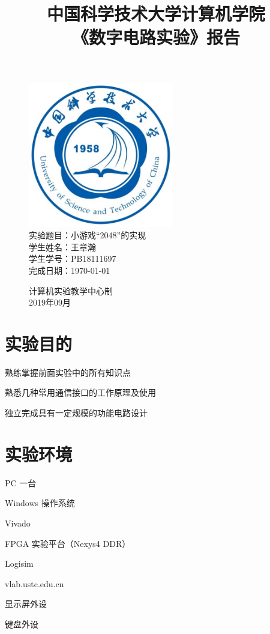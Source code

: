 \documentclass[UTF8]{article}
\title{中国科学技术大学计算机学院\\《数字电路实验》报告}
\author{}
\date{}
\begin{document}
	\maketitle
	\begin{figure}[H]
		\centering
		\includegraphics[width=2.5in]{xiaohui.jpg}\vspace{0.5cm}\\
		\large{
			实验题目：小游戏“2048”的实现\\
			学生姓名：王章瀚\\
			学生学号：PB18111697\\
			完成日期：\today\\
		}\vspace{2cm}
		
		\large{计算机实验教学中心制\\2019年09月\\}
		\thispagestyle{empty}
		\clearpage  %
	\end{figure}


	\section{实验目的}
	熟练掌握前面实验中的所有知识点\par
	熟悉几种常用通信接口的工作原理及使用\par
	独立完成具有一定规模的功能电路设计\par
	
	\section{实验环境}
	PC 一台\par
	Windows 操作系统\par
	Vivado\par
	FPGA 实验平台（Nexys4 DDR）\par
	Logisim\par
	vlab.ustc.edu.cn\par
	显示屏外设\par
	键盘外设\par
	
\end{document}
